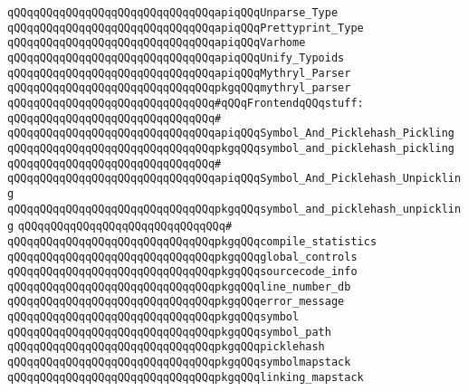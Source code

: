 \verb|qQQqqQQqqQQqqQQqqQQqqQQqqQQqqQQqapiqQQqUnparse_Type|\newline
\verb|qQQqqQQqqQQqqQQqqQQqqQQqqQQqqQQqapiqQQqPrettyprint_Type|\newline
\verb|qQQqqQQqqQQqqQQqqQQqqQQqqQQqqQQqapiqQQqVarhome|\newline
\verb|qQQqqQQqqQQqqQQqqQQqqQQqqQQqqQQqapiqQQqUnify_Typoids|\newline
\newline
\verb|qQQqqQQqqQQqqQQqqQQqqQQqqQQqqQQqapiqQQqMythryl_Parser|\newline
\verb|qQQqqQQqqQQqqQQqqQQqqQQqqQQqqQQqpkgqQQqmythryl_parser|\newline
\newline
\verb|qQQqqQQqqQQqqQQqqQQqqQQqqQQqqQQq#qQQqFrontendqQQqstuff:|\newline
\verb|qQQqqQQqqQQqqQQqqQQqqQQqqQQqqQQq#|\newline
\verb|qQQqqQQqqQQqqQQqqQQqqQQqqQQqqQQqapiqQQqSymbol_And_Picklehash_Pickling|\newline
\verb|qQQqqQQqqQQqqQQqqQQqqQQqqQQqqQQqpkgqQQqsymbol_and_picklehash_pickling|\newline
\verb|qQQqqQQqqQQqqQQqqQQqqQQqqQQqqQQq#|\newline
\verb|qQQqqQQqqQQqqQQqqQQqqQQqqQQqqQQqapiqQQqSymbol_And_Picklehash_Unpickling|\newline
\verb|qQQqqQQqqQQqqQQqqQQqqQQqqQQqqQQqpkgqQQqsymbol_and_picklehash_unpickling|\newline
\verb|qQQqqQQqqQQqqQQqqQQqqQQqqQQqqQQq#|\newline
\verb|qQQqqQQqqQQqqQQqqQQqqQQqqQQqqQQqpkgqQQqcompile_statistics|\newline
\verb|qQQqqQQqqQQqqQQqqQQqqQQqqQQqqQQqpkgqQQqglobal_controls|\newline
\verb|qQQqqQQqqQQqqQQqqQQqqQQqqQQqqQQqpkgqQQqsourcecode_info|\newline
\verb|qQQqqQQqqQQqqQQqqQQqqQQqqQQqqQQqpkgqQQqline_number_db|\newline
\verb|qQQqqQQqqQQqqQQqqQQqqQQqqQQqqQQqpkgqQQqerror_message|\newline
\verb|qQQqqQQqqQQqqQQqqQQqqQQqqQQqqQQqpkgqQQqsymbol|\newline
\verb|qQQqqQQqqQQqqQQqqQQqqQQqqQQqqQQqpkgqQQqsymbol_path|\newline
\verb|qQQqqQQqqQQqqQQqqQQqqQQqqQQqqQQqpkgqQQqpicklehash|\newline
\verb|qQQqqQQqqQQqqQQqqQQqqQQqqQQqqQQqpkgqQQqsymbolmapstack|\newline
\verb|qQQqqQQqqQQqqQQqqQQqqQQqqQQqqQQqpkgqQQqlinking_mapstack|\newline
